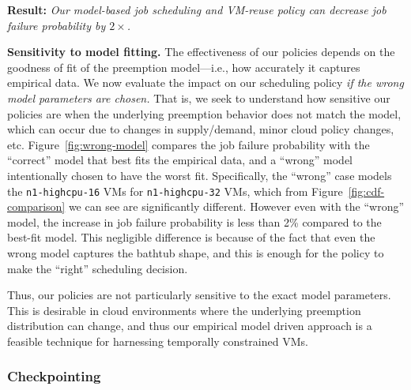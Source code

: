 \noindent \textbf{Result:} \emph{Our model-based job scheduling and VM-reuse policy can decrease job failure probability by $2\times$.}





\noindent \textbf{Sensitivity to model fitting.}
The effectiveness of our policies depends on the goodness of fit of the preemption model---i.e., how accurately it captures empirical data.
%
We now evaluate the impact on our scheduling policy \emph{if the wrong model parameters are chosen.}
%
That is, we seek to understand how sensitive our policies are when the underlying preemption behavior does not match the model, which can occur due to changes in supply/demand, minor cloud policy changes, etc.
%
Figure~\ref{fig:wrong-model} compares the job failure probability with the ``correct'' model that best fits the empirical data, and a ``wrong'' model intentionally chosen to have the worst fit.
%
Specifically, the ``wrong'' case models the \texttt{n1-highcpu-16} VMs for \texttt{n1-highcpu-32} VMs, which from Figure~\ref{fig:cdf-comparison} we can see are significantly different.
%
However even with the ``wrong'' model, the increase in job failure probability is less than 2\% compared to the best-fit model.
%
This negligible difference is because of the fact that even the wrong model captures the bathtub shape, and this is enough for the policy to make the ``right'' scheduling decision.

Thus, our policies are not particularly sensitive to the exact model parameters.
%
This is desirable in cloud environments where the underlying preemption distribution can change, and thus our empirical model driven approach is a feasible technique for harnessing temporally constrained VMs. 





\vspace*{\subsecspace}
\subsubsection{Checkpointing}
\label{subsec:eval-ckpt}

